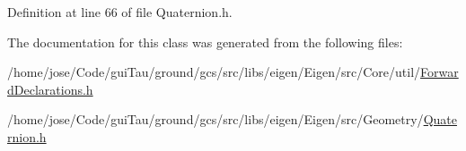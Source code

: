 Definition at line 66 of file Quaternion.\-h.



The documentation for this class was generated from the following files\-:\begin{DoxyCompactItemize}
\item 
/home/jose/\-Code/gui\-Tau/ground/gcs/src/libs/eigen/\-Eigen/src/\-Core/util/\hyperlink{_forward_declarations_8h}{Forward\-Declarations.\-h}\item 
/home/jose/\-Code/gui\-Tau/ground/gcs/src/libs/eigen/\-Eigen/src/\-Geometry/\hyperlink{_quaternion_8h}{Quaternion.\-h}\end{DoxyCompactItemize}

